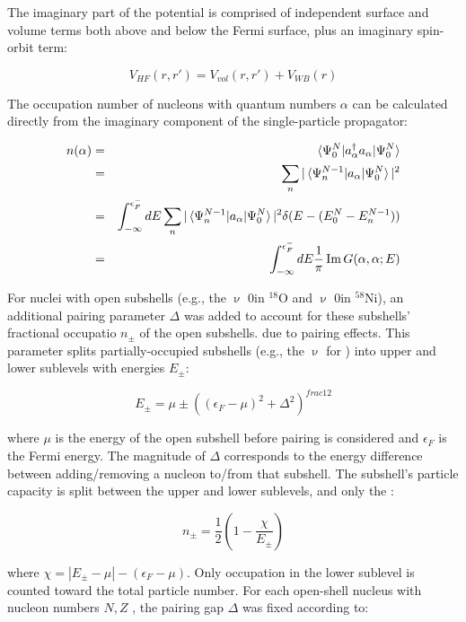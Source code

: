The imaginary part of the potential is comprised of independent surface and volume terms
both above and below the Fermi surface, plus an imaginary spin-orbit term:

\begin{equation}
    V_{HF}(r,r') = V_{vol}(r,r') + V_{WB}(r)
\end{equation}

The occupation number of nucleons with quantum numbers $\alpha$ can be
calculated directly from the imaginary component of the single-particle
propagator:

\begin{eqnarray}
    n(\alpha)
    & = & \braket{\Psi^{N}_{0}|a^{\dagger}_{\alpha}a_{\alpha}|\Psi^{N}_{0}}\\
    & = & \sum_{n}|\braket{\Psi^{N-1}_{n}|a_{\alpha}|\Psi^{N}_{0}}|^{2}\\
    & = & \int_{-\infty}^{\epsilon_{F}^{-}} dE
\sum_{n}|\braket{\Psi^{N-1}_{n}|a_{\alpha}|\Psi^{N}_{0}}|^{2}
\delta(E-(E^{N}_{0}-E^{N-1}_{n}))\\
& = & \int_{-\infty}^{\epsilon_{F}^{-}} dE \frac{1}{\pi}\operatorname{Im}G(\alpha,\alpha;E)
\end{eqnarray}


For nuclei with open subshells (e.g., the $\upnu$ 0\dFive in $^{18}$O and
$\upnu$ 0\fFive in $^{58}$Ni), an additional
pairing parameter $\Delta$ was added to
account for these subshells' fractional occupatio $n_{\pm}$ of the open subshells. due to pairing
effects. This parameter splits partially-occupied subshells (e.g., the $\upnu$\dFive
for \oEight) into upper and lower sublevels with energies $E_{\pm}$:

\begin{equation}
    E_{\pm} = \mu \pm ((\epsilon_{F}-\mu)^{2} + \Delta^{2})^{frac{1}{2}}
\end{equation}

where $\mu$ is the energy of the open subshell before pairing is considered and
$\epsilon_{F}$ is the Fermi
energy. The magnitude of $\Delta$ corresponds to the energy difference between
adding/removing a nucleon to/from that subshell. The subshell's particle
capacity is split between the upper and lower sublevels, and only the :

\begin{equation}
    n_{\pm} = \frac{1}{2}\left( 1-\frac{\chi}{E_{\pm}}\right)
\end{equation}

where $\chi = |E_{\pm}-\mu| - (\epsilon_{F} - \mu)$. Only occupation in the
lower sublevel is counted toward the total particle number. For each open-shell
nucleus with nucleon numbers $N, Z$ , the pairing gap $\Delta$ was fixed according to:

